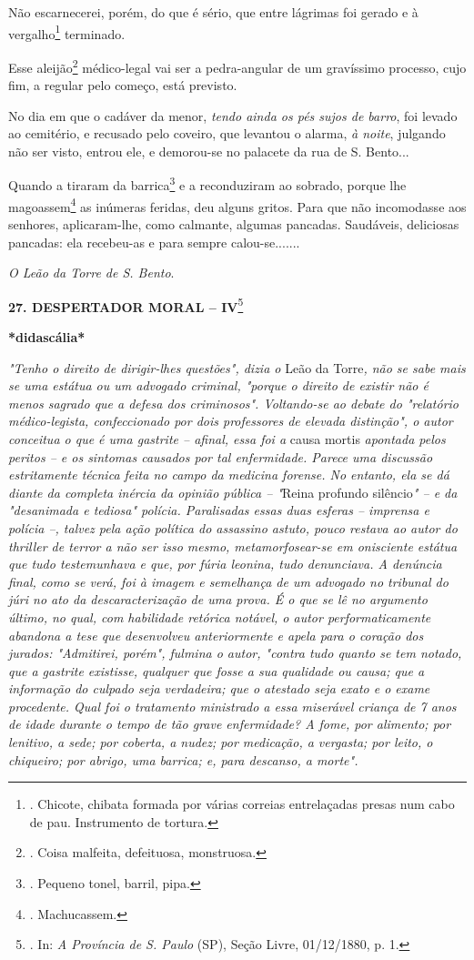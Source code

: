 Não escarnecerei, porém, do que é sério, que entre lágrimas foi gerado e
à vergalho\footnote{. Chicote, chibata formada por várias correias
  entrelaçadas presas num cabo de pau. Instrumento de tortura.}
terminado.

Esse aleijão\footnote{. Coisa malfeita, defeituosa, monstruosa.}
médico-legal vai ser a pedra-angular de um gravíssimo processo, cujo
fim, a regular pelo começo, está previsto.

No dia em que o cadáver da menor, \emph{tendo ainda os pés sujos de
barro}, foi levado ao cemitério, e recusado pelo coveiro, que levantou o
alarma, \emph{à noite}, julgando não ser visto, entrou ele, e demorou-se
no palacete da rua de S. Bento...

Quando a tiraram da barrica\footnote{. Pequeno tonel, barril, pipa.} e a
reconduziram ao sobrado, porque lhe magoassem\footnote{. Machucassem.}
as inúmeras feridas, deu
alguns gritos. Para que não incomodasse aos senhores, aplicaram-lhe,
como calmante, algumas pancadas. Saudáveis, deliciosas pancadas: ela
recebeu-as e para sempre calou-se.......

\emph{O Leão da Torre de S. Bento}.

\textbf{27. DESPERTADOR MORAL -- IV}\footnote{. In: \emph{A Província de
  S. Paulo} (SP), Seção Livre, 01/12/1880, p. 1.}

\textbf{*didascália*}

\emph{"Tenho o direito de dirigir-lhes questões", dizia o} Leão da
Torre\emph{, não se sabe mais se uma estátua ou um advogado criminal,
"porque o direito de existir não é menos sagrado que a defesa dos
criminosos". Voltando-se ao debate do "relatório médico-legista,
confeccionado por dois professores de elevada distinção", o autor
conceitua o que é uma gastrite -- afinal, essa foi a} causa mortis
\emph{apontada pelos peritos -- e os sintomas causados por tal
enfermidade. Parece uma discussão estritamente técnica feita no campo da
medicina forense. No entanto, ela se dá diante da completa inércia da
opinião pública -- "}Reina profundo silêncio\emph{" -- e da "desanimada
e tediosa" polícia. Paralisadas essas duas esferas -- imprensa e polícia
--, talvez pela ação política do assassino astuto, pouco restava ao
autor do thriller de terror a não ser isso mesmo, metamorfosear-se em
onisciente estátua que tudo testemunhava e que, por fúria leonina, tudo
denunciava. A denúncia final, como se verá, foi à imagem e semelhança de
um advogado no tribunal do júri no ato da descaracterização de uma
prova. É o que se lê no argumento último, no qual, com habilidade
retórica notável, o autor performaticamente abandona a tese que
desenvolveu anteriormente e apela para o coração dos jurados:
"Admitirei, porém", fulmina o autor, "contra tudo quanto se tem notado,
que a gastrite existisse, qualquer que fosse a sua qualidade ou causa;
que a informação do culpado seja verdadeira; que o atestado seja exato e
o exame procedente. Qual foi o tratamento ministrado a essa miserável
criança de 7 anos de idade durante o tempo de tão grave enfermidade? A
fome, por alimento; por lenitivo, a sede; por coberta, a nudez; por
medicação, a vergasta; por leito, o chiqueiro; por abrigo, uma barrica;
e, para descanso, a morte". }

